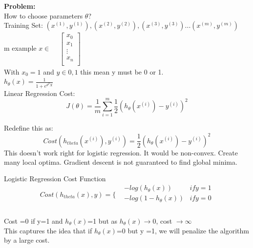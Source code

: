 \textbf{Problem:}\\
How to choose parameters $\theta$?\\
Training Set: ${(x^{(1)}, y^{(1)}), (x^{(2)}, y^{(2)}), (x^{(3)}, y^{(3)}) ... (x^{(m)}, y^{(m)}) }$\\
m example $x \in   \begin{aligned}
  & \begin{bmatrix}
    x_{0}\\
    x_{1}\\
    \vdots\\
    x_{n}\\    
    \end{bmatrix}
\end{aligned}
  $\\

  With $x_{0}=1$ and $y \in {0,1}$ this mean y must be 0 or 1.\\
  $h_{\theta}(x) = \frac{1}{1+e^{\theta^{T}X}}$\\

  
  Linear Regression Cost:
  \begin{equation}
    J(\theta) = \frac{1}{m} \sum_{i=1}^{m} \frac{1}{2} (h_{\theta}(x^{(i)}) - y^{(i)})^{2}
  \end{equation}

  Redefine this as:
  \begin{equation}
    Cost(h_{theta}(x^{(i)}), y^{(i)} ) = \frac{1}{2} (h_{\theta}(x^{(i)}) - y^{(i)})^{2}
  \end{equation}
  This doesn't work right for logistic regression.  It would be non-convex.  Create many local optima.  Gradient descent is not guaranteed to find global minima.

  Logistic Regression Cost Function\\
  \begin{equation}
    Cost(h_{theta}(x), y) = \Bigg \{
    \begin{aligned}
      &-log(h_{\theta}(x))  & if y =1 \\
      &-log(1-h_{\theta}(x)) & if y = 0\\
    \end{aligned}
  \end{equation}\\

  Cost =0 if y=1 and $h_{\theta}(x)$=1 but as $h_{\theta}(x) \rightarrow 0$, cost $\rightarrow \infty$\\
  This captures the idea that if $h_{\theta}(x)$=0 but y =1, we will penalize the algorithm by a large cost.\\
  
